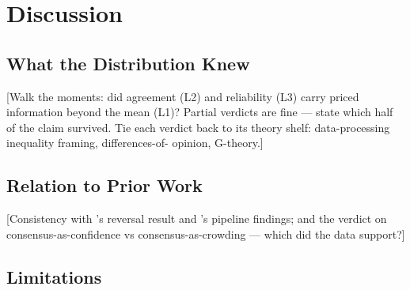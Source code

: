 %
%
%
\chapter{Discussion}
\label{ch:discussion}

\section{What the Distribution Knew}
\label{sec:disc-claim}

[Walk the moments: did agreement (L2) and reliability (L3) carry
priced information beyond the mean (L1)? Partial verdicts are fine ---
state which half of the claim survived. Tie each verdict back to its
theory shelf: data-processing inequality framing, differences-of-
opinion, G-theory.]

\section{Relation to Prior Work}
\label{sec:disc-prior}

[Consistency with \textcite{tetlock2007}'s reversal result and
\textcite{mitic2026llm}'s pipeline findings; and the verdict on
consensus-as-confidence vs consensus-as-crowding --- which did the
data support?]

\section{Limitations}
\label{sec:disc-limitations}

